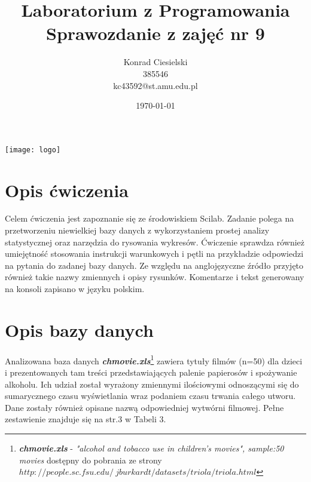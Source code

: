 \documentclass[a4paper, 11pt]{article}
\author{Konrad Ciesielski\\385546\\kc43592@st.amu.edu.pl}
\title{Laboratorium z Programowania\\ 
Sprawozdanie z zajęć nr 9}
\date{\today}
\begin{document}



\lstset{escapechar=@,style=customc}


\maketitle

\begin{center}
\texttt{[image: logo]}
\end{center}
 
\newpage
\tableofcontents
\newpage %
\section{Opis ćwiczenia}
\-\hspace{8mm}Celem ćwiczenia jest zapoznanie się ze środowiskiem Scilab. Zadanie polega na przetworzeniu niewielkiej bazy danych z wykorzystaniem prostej analizy statystycznej oraz narzędzia do rysowania wykresów. Ćwiczenie sprawdza również umiejętność stosowania instrukcji warunkowych i pętli na przykładzie odpowiedzi na pytania do zadanej bazy danych. Ze względu na anglojęzyczne źródło przyjęto również takie nazwy zmiennych i opisy rysunków. Komentarze i tekst generowany na konsoli zapisano w języku polskim. 
\section{Opis bazy danych}
\-\hspace{8mm}Analizowana baza danych \textbf{\textit{chmovie.xls}}\footnote{ \textbf{\textit{chmovie.xls}} - \textit{"alcohol and tobacco use in children's movies", sample:50 movies} dostępny do pobrania ze strony $http://people.sc.fsu.edu/~jburkardt/datasets/triola/triola.html$} zawiera tytuły filmów (n=50) dla dzieci i prezentowanych tam treści przedstawiających palenie papierosów i spożywanie alkoholu. Ich udział został wyrażony zmiennymi ilościowymi odnoszącymi się do sumarycznego czasu wyświetlania wraz podaniem czasu trwania całego utworu. Dane zostały również opisane nazwą odpowiedniej wytwórni filmowej. Pełne zestawienie znajduje się na str.3 w Tabeli 3. 
\end{document}
